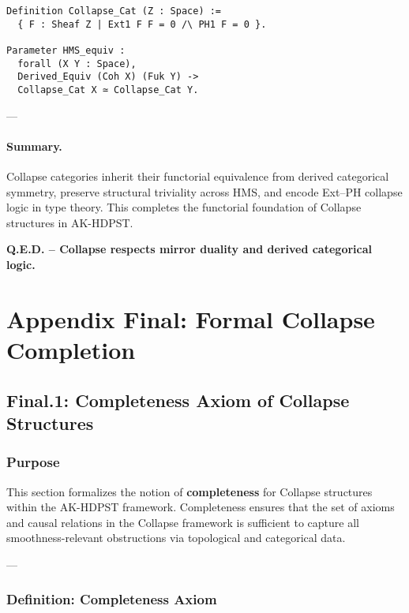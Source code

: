 \documentclass[11pt]{article}
\begin{document}
\begin{axiom}
\begin{axiom}
{{\begin{lstlisting}[language=Coq, caption=Collapse Functor Equivalence in Type Theory]
Definition Collapse_Cat (Z : Space) :=
  { F : Sheaf Z | Ext1 F F = 0 /\ PH1 F = 0 }.

Parameter HMS_equiv :
  forall (X Y : Space),
  Derived_Equiv (Coh X) (Fuk Y) ->
  Collapse_Cat X ≃ Collapse_Cat Y.
\end{lstlisting}

---

\paragraph{Summary.}

Collapse categories inherit their functorial equivalence from derived categorical symmetry,  
preserve structural triviality across HMS, and encode Ext–PH collapse logic in type theory.  
This completes the functorial foundation of Collapse structures in AK-HDPST.

\begin{center}
\textbf{Q.E.D. – Collapse respects mirror duality and derived categorical logic.}
\end{center}





\section*{Appendix Final: Formal Collapse Completion}

\subsection*{Final.1: Completeness Axiom of Collapse Structures}

\subsubsection*{Purpose}

This section formalizes the notion of \textbf{completeness} for Collapse structures within the AK-HDPST framework.  
Completeness ensures that the set of axioms and causal relations in the Collapse framework is sufficient  
to capture all smoothness-relevant obstructions via topological and categorical data.

---

\subsubsection*{Definition: Completeness Axiom}

}}
\end{axiom}
\end{axiom}
\end{document}
